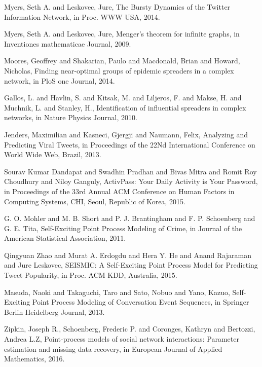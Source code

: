 \documentclass[smallextended]{svjour3}       %
\theoremstyle{definition}
\begin{document}
\begin{thebibliography}{}
{Myers, Seth A. and Leskovec, Jure},
The Bursty Dynamics of the Twitter Information Network,
in Proc. WWW USA,
{2014.}

{Myers, Seth A. and Leskovec, Jure},
Menger’s theorem for infinite graphs,
in Inventiones mathematicae Journal,
{2009.}

{Moores, Geoffrey and Shakarian, Paulo and Macdonald, Brian and Howard, Nicholas},
Finding near-optimal groups of epidemic spreaders in a complex network,
in PloS one Journal,
{2014.}

{Gallos, L. and Havlin, S. and Kitsak, M. and Liljeros, F. and Makse, H. and Muchnik, L. and Stanley, H.},
Identification of influential spreaders in complex networks,
in Nature Physics Journal,
{2010.}

{Jenders, Maximilian and Kasneci, Gjergji and Naumann, Felix},
Analyzing and Predicting Viral Tweets,
in Proceedings of the 22Nd International Conference on World Wide Web, Brazil,
{2013.}

{Sourav Kumar Dandapat and
	Swadhin Pradhan and
	Bivas Mitra and
	Romit Roy Choudhury and
	Niloy Ganguly},
ActivPass: Your Daily Activity is Your Password,
in Proceedings of the 33rd Annual {ACM} Conference on Human Factors in
Computing Systems, {CHI}, Seoul, Republic of Korea,
{2015.}

{G. O. Mohler and M. B. Short and P. J. Brantingham and F. P. Schoenberg and G. E. Tita},
Self-Exciting Point Process Modeling of Crime,
in Journal of the American Statistical Association,
{2011.}


{Qingyuan Zhao and
	Murat A. Erdogdu and
	Hera Y. He and
	Anand Rajaraman and
	Jure Leskovec},
{SEISMIC:} {A} Self-Exciting Point Process Model for Predicting Tweet
Popularity,
in Proc. ACM KDD, Australia,
{2015.}

{Masuda, Naoki and Takaguchi, Taro and Sato, Nobuo and Yano, Kazuo},
Self-Exciting Point Process Modeling of Conversation Event Sequences,
in Springer Berlin Heidelberg Journal,
{2013.}

{Zipkin, Joseph R., Schoenberg, Frederic P. and Coronges, Kathryn and Bertozzi, Andrea L.Z},
Point-process models of social network interactions: Parameter estimation and missing data recovery,
in European Journal of Applied Mathematics,
{2016.}


\end{thebibliography}
\end{document}
